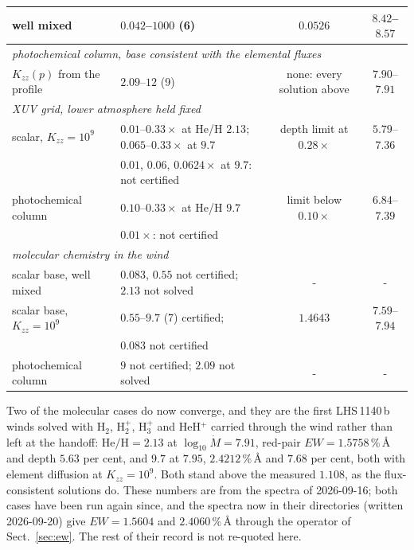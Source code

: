 \documentclass[english,a4paper]{my_memo}
\begin{document}
\begin{table}[htbp]
\begin{tabular}{llcc}
well mixed & $0.042$--$1000$ (6) & $0.0526$ & $8.42$--$8.57$ \\
\midrule
\multicolumn{4}{l}{\emph{photochemical column, base consistent with the elemental fluxes}}\\
$K_{zz}(p)$ from the profile & $2.09$--$12$ (9) &
none: every solution above & $7.90$--$7.91$ \\
\midrule
\multicolumn{4}{l}{\emph{XUV grid, lower atmosphere held fixed}}\\
scalar, $K_{zz} = 10^{9}$ & $0.01$--$0.33 \times$ at He/H $2.13$;
$0.065$--$0.33\times$ at $9.7$ & depth limit at $0.28\times$ & $5.79$--$7.36$ \\
 & $0.01$, $0.06$, $0.0624\times$ at $9.7$: not certified & & \\
photochemical column & $0.10$--$0.33 \times$ at He/H $9.7$ &
limit below $0.10\times$ & $6.84$--$7.39$ \\
 & $0.01\times$: not certified & & \\
\midrule
\multicolumn{4}{l}{\emph{molecular chemistry in the wind}}\\
scalar base, well mixed & $0.083$, $0.55$ not certified; $2.13$ not solved
& - & - \\
scalar base, $K_{zz} = 10^{9}$ & $0.55$--$9.7$ (7) certified; & $1.4643$ &
$7.59$--$7.94$ \\
 & $0.083$ not certified & & \\
photochemical column & $9$ not certified; $2.09$ not solved & - & - \\
\bottomrule
\end{tabular}
\end{table}

\noindent Two of the molecular cases do now converge, and they are the first
LHS\,1140\,b winds solved with H$_2$, H$_2^+$, H$_3^+$ and HeH$^+$ carried
through the wind rather than left at the handoff:
$\mathrm{He/H} = 2.13$ at $\log_{10}\dot M = 7.91$, red-pair
$EW = 1.5758$\,\%\,\AA{} and depth $5.63$ per cent, and $9.7$ at $7.95$,
$2.4212$\,\%\,\AA{} and $7.68$ per cent, both with element diffusion at
$K_{zz} = 10^{9}$. Both stand above the measured $1.108$, as the
flux-consistent solutions do. These numbers are from the spectra of
2026-09-16; both cases have been run again since, and the spectra now in
their directories (written 2026-09-20) give $EW = 1.5604$ and
$2.4060$\,\%\,\AA{} through the operator of Sect.~\ref{sec:ew}. The rest of
their record is not re-quoted here.
\end{document}

